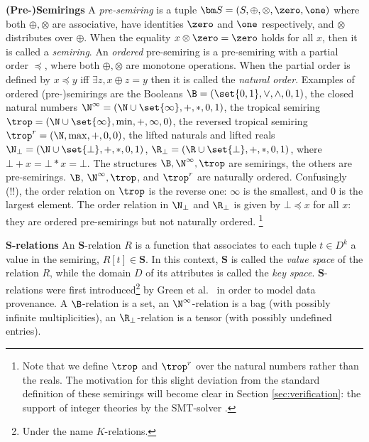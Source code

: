 {\bf (Pre-)Semirings} A {\em pre-semiring} is a tuple
$\bm S = (S, \oplus, \otimes, \zero, \one)$ where  both $\oplus, \otimes$ are associative, have
identities $\zero$ and $\one$ respectively, and $\otimes$ distributes
over $\oplus$.    When the equality $x \otimes \zero = \zero$ holds
for all $x$, then it is called a {\em semiring}.  An {\em ordered}
pre-semiring is a pre-semiring with a partial order $\preceq$, where
both $\oplus, \otimes$ are monotone operations.  When the partial
order is defined by $x\preceq y$ iff $\exists z, x\oplus z = y$ then
it is called the {\em natural order}.  Examples of ordered
(pre-)semirings are the Booleans
$\B = (\set{0,1}, \vee, \wedge, 0, 1)$, the closed natural numbers
$\N^\infty = (\N \cup \set{\infty},+,*,0,1)$, the tropical semiring
$\trop = (\N \cup \set{\infty}, \min, +, \infty,0)$, the reversed
tropical semiring $\trop^r=(\N, \max, +, 0, 0)$, the lifted naturals
and lifted reals $\N_\bot = (\N \cup \set{\bot}, +, *, 0, 1)$,
$\R_\bot = (\R \cup \set{\bot}, +, *, 0, 1)$, where
$\bot + x = \bot * x = \bot$.  The structures $\B, \N^\infty, \trop$
are semirings, the others are pre-semirings.  $\B$,
$\N^\infty, \trop$, and $\trop^r$ are naturally ordered.  Confusingly
(!!), the order relation on $\trop$ is the reverse one: $\infty$ is
the smallest, and $0$ is the largest element.  The order relation in
$\N_\bot$ and $\R_\bot$ is given by $\bot \preceq x$ for all $x$: they
are ordered pre-semirings but not naturally ordered.%
\footnote{Note that we define $\trop$ and $\trop^r$ over the natural
  numbers rather than the reals. The motivation for this slight
  deviation from the standard definition of these semirings will
  become clear in Section \ref{sec:verification}: the support of
  integer theories by the SMT-solver \zzz.}



{\bf $\bm S$-relations} An $\bm S$-relation $R$ is a function that
associates to each tuple $t \in D^k$ a value in the semiring,
$R[t] \in \bm S$.  In this context, $\bm S$ is called the {\em value
  space} of the relation $R$, while the domain $D$ of its attributes
is called the {\em key space}.  $\bm S$-relations were first
introduced\footnote{Under the name $K$-relations.} by Green et
al.~\cite{DBLP:conf/pods/GreenKT07} in order to model data provenance.
A $\B$-relation is a set, an $\N^\infty$-relation is a bag (with
possibly infinite multiplicities), an $\R_\bot$-relation is a tensor
(with possibly undefined entries).

